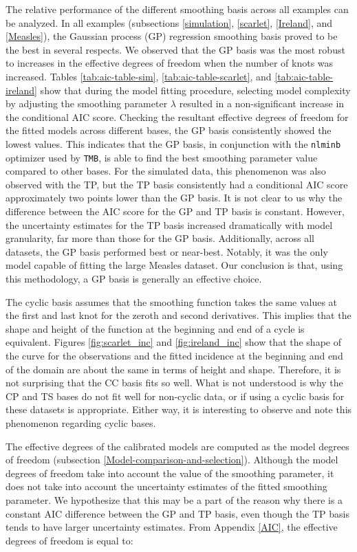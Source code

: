 \documentclass[
11pt, %
oneside, %
english, %
singlespacing, %
]{macthesis} %
\begin{document}
The relative performance of the different smoothing basis across all examples can be analyzed. In all examples (subsections \ref{simulation}, \ref{scarlet}, \ref{Ireland}, and \ref{Measles}), the Gaussian process (GP) regression smoothing basis proved to be the best in several respects. We observed that the GP basis was the most robust to increases in the effective degrees of freedom when the number of knots was increased. Tables \ref{tab:aic-table-sim}, \ref{tab:aic-table-scarlet}, and \ref{tab:aic-table-ireland} show that during the model fitting procedure, selecting model complexity by adjusting the smoothing parameter \(\lambda\) resulted in a non-significant increase in the conditional AIC score. Checking the resultant effective degrees of freedom for the fitted models across different bases, the GP basis consistently showed the lowest values. This indicates that the GP basis, in conjunction with the \texttt{nlminb} optimizer used by \texttt{TMB}, is able to find the best smoothing parameter value compared to other bases. For the simulated data, this phenomenon was also observed with the TP, but the TP basis consistently had a conditional AIC score approximately two points lower than the GP basis. It is not clear to us why the difference between the AIC score for the GP and TP basis is constant. However, the uncertainty estimates for the TP basis increased dramatically with model granularity, far more than those for the GP basis. Additionally, across all datasets, the GP basis performed best or near-best. Notably, it was the only model capable of fitting the large Measles dataset. Our conclusion is that, using this methodology, a GP basis is generally an effective choice.

The cyclic basis assumes that the smoothing function takes the same values at the first and last knot for the zeroth and second derivatives. This implies that the shape and height of the function at the beginning and end of a cycle is equivalent. Figures \ref{fig:scarlet_inc} and \ref{fig:ireland_inc} show that the shape of the curve for the observations and the fitted incidence at the beginning and end of the domain are about the same in terms of height and shape. Therefore, it is not surprising that the CC basis fits so well. What is not understood is why the CP and TS bases do not fit well for non-cyclic data, or if using a cyclic basis for these datasets is appropriate. Either way, it is interesting to observe and note this phenomenon regarding cyclic bases.

The effective degrees of the calibrated models are computed as the model degrees of freedom (subsection \ref{Model-comparison-and-selection}). Although the model degrees of freedom take into account the value of the smoothing parameter, it does not take into account the uncertainty estimates of the fitted smoothing parameter. We hypothesize that this may be a part of the reason why there is a constant AIC difference between the GP and TP basis, even though the TP basis tends to have larger uncertainty estimates. From Appendix \ref{AIC}, the effective degrees of freedom is equal to:
\end{document}
